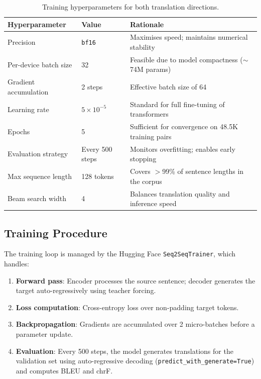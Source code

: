 \documentclass[12pt,a4paper]{article}
\begin{document}
\begin{table}[H]
\centering
\begin{tabular}{@{}p{5cm}p{3cm}p{6cm}@{}}
\toprule
\textbf{Hyperparameter} & \textbf{Value} & \textbf{Rationale} \\
\midrule
Precision & \texttt{bf16} & Maximises speed; maintains numerical stability \\
Per-device batch size & 32 & Feasible due to model compactness ($\sim$74M params) \\
Gradient accumulation & 2 steps & Effective batch size of 64 \\
Learning rate & $5 \times 10^{-5}$ & Standard for full fine-tuning of transformers \\
Epochs & 5 & Sufficient for convergence on 48.5K training pairs \\
Evaluation strategy & Every 500 steps & Monitors overfitting; enables early stopping \\
Max sequence length & 128 tokens & Covers $>$99\% of sentence lengths in the corpus \\
Beam search width & 4 & Balances translation quality and inference speed \\
\bottomrule
\end{tabular}
\caption{Training hyperparameters for both translation directions.}
\end{table}

\subsection{Training Procedure}

The training loop is managed by the Hugging Face \texttt{Seq2SeqTrainer}, which handles:

\begin{enumerate}
    \item \textbf{Forward pass}: Encoder processes the source sentence; decoder generates the target auto-regressively using teacher forcing.
    \item \textbf{Loss computation}: Cross-entropy loss over non-padding target tokens.
    \item \textbf{Backpropagation}: Gradients are accumulated over 2 micro-batches before a parameter update.
    \item \textbf{Evaluation}: Every 500 steps, the model generates translations for the validation set using auto-regressive decoding (\texttt{predict\_with\_generate=True}) and computes BLEU and chrF.
\end{enumerate}
\end{document}
